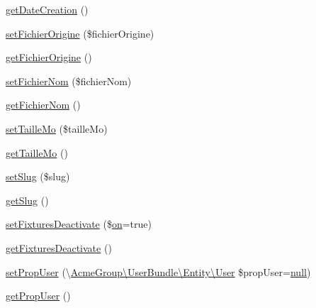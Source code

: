 \begin{DoxyCompactItemize}
\item 
\hyperlink{class_acme_group_1_1_labo_bundle_1_1_entity_1_1fichier_pdf_aadb46920d0f8368f8009c76028ca7a73}{get\+Date\+Creation} ()
\item 
\hyperlink{class_acme_group_1_1_labo_bundle_1_1_entity_1_1fichier_pdf_ad7e5d3ea2ab45599a3b5d29067544b23}{set\+Fichier\+Origine} (\$fichier\+Origine)
\item 
\hyperlink{class_acme_group_1_1_labo_bundle_1_1_entity_1_1fichier_pdf_a857a81fec50607c7768636dbbed2923b}{get\+Fichier\+Origine} ()
\item 
\hyperlink{class_acme_group_1_1_labo_bundle_1_1_entity_1_1fichier_pdf_a5c5084f5ee92699dee734a4732c32752}{set\+Fichier\+Nom} (\$fichier\+Nom)
\item 
\hyperlink{class_acme_group_1_1_labo_bundle_1_1_entity_1_1fichier_pdf_a82458eebe1fdaed90ac757209bb15c22}{get\+Fichier\+Nom} ()
\item 
\hyperlink{class_acme_group_1_1_labo_bundle_1_1_entity_1_1fichier_pdf_a379c96d6ab41f200b51ccb6346518cde}{set\+Taille\+Mo} (\$taille\+Mo)
\item 
\hyperlink{class_acme_group_1_1_labo_bundle_1_1_entity_1_1fichier_pdf_a16e983c01ce541479a5b5da27ed7fc15}{get\+Taille\+Mo} ()
\item 
\hyperlink{class_acme_group_1_1_labo_bundle_1_1_entity_1_1fichier_pdf_a882c20e41f9d37ed4f4e5db8997dee94}{set\+Slug} (\$slug)
\item 
\hyperlink{class_acme_group_1_1_labo_bundle_1_1_entity_1_1fichier_pdf_a3b14af8a8db67a6fea9589b323a8ebe4}{get\+Slug} ()
\item 
\hyperlink{class_acme_group_1_1_labo_bundle_1_1_entity_1_1fichier_pdf_a42f5831289ec3e8a761528ddc60659d7}{set\+Fixtures\+Deactivate} (\$\hyperlink{fullpage_2plugin_8min_8js_a1cfa98b7fed2aaf9fee3b68dbb7f9497}{on}=true)
\item 
\hyperlink{class_acme_group_1_1_labo_bundle_1_1_entity_1_1fichier_pdf_a961422a491eb596416e25e08c75d7b8a}{get\+Fixtures\+Deactivate} ()
\item 
\hyperlink{class_acme_group_1_1_labo_bundle_1_1_entity_1_1fichier_pdf_a2f08809669715ac7910ae5150875c480}{set\+Prop\+User} (\textbackslash{}\hyperlink{class_acme_group_1_1_user_bundle_1_1_entity_1_1_user}{Acme\+Group\textbackslash{}\+User\+Bundle\textbackslash{}\+Entity\textbackslash{}\+User} \$prop\+User=\hyperlink{validate_8js_afb8e110345c45e74478894341ab6b28e}{null})
\item 
\hyperlink{class_acme_group_1_1_labo_bundle_1_1_entity_1_1fichier_pdf_aeedabe21cf4d04a7f0aeba93035205fa}{get\+Prop\+User} ()

\end{DoxyCompactItemize}
